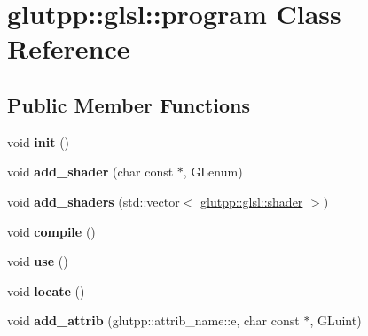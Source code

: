 \hypertarget{classglutpp_1_1glsl_1_1program}{\section{glutpp\-:\-:glsl\-:\-:program \-Class \-Reference}
\label{classglutpp_1_1glsl_1_1program}
}
\subsection*{\-Public \-Member \-Functions}
\begin{DoxyCompactItemize}
\item 
\hypertarget{classglutpp_1_1glsl_1_1program_a99ca8f6dd61152904e42afb7d1b459a3}{void {\bfseries init} ()}\label{classglutpp_1_1glsl_1_1program_a99ca8f6dd61152904e42afb7d1b459a3}

\item 
\hypertarget{classglutpp_1_1glsl_1_1program_a6cde9b2647b830ed62bb4bd34837d9fd}{void {\bfseries add\-\_\-shader} (char const $\ast$, \-G\-Lenum)}\label{classglutpp_1_1glsl_1_1program_a6cde9b2647b830ed62bb4bd34837d9fd}

\item 
\hypertarget{classglutpp_1_1glsl_1_1program_a222ee5c2b9f2f6896b6f7fe16b2864b0}{void {\bfseries add\-\_\-shaders} (std\-::vector$<$ \hyperlink{classglutpp_1_1glsl_1_1shader}{glutpp\-::glsl\-::shader} $>$)}\label{classglutpp_1_1glsl_1_1program_a222ee5c2b9f2f6896b6f7fe16b2864b0}

\item 
\hypertarget{classglutpp_1_1glsl_1_1program_aee7d2cd7b292e8dcbd7ebcdc704bfe63}{void {\bfseries compile} ()}\label{classglutpp_1_1glsl_1_1program_aee7d2cd7b292e8dcbd7ebcdc704bfe63}

\item 
\hypertarget{classglutpp_1_1glsl_1_1program_af94447e84217b4d222c9bc0104ae3ec8}{void {\bfseries use} ()}\label{classglutpp_1_1glsl_1_1program_af94447e84217b4d222c9bc0104ae3ec8}

\item 
\hypertarget{classglutpp_1_1glsl_1_1program_a0b7490fa9a0396a052d7d37140a551ab}{void {\bfseries locate} ()}\label{classglutpp_1_1glsl_1_1program_a0b7490fa9a0396a052d7d37140a551ab}

\item 
\hypertarget{classglutpp_1_1glsl_1_1program_af2403d0061bcb6e7eff6fd0e27ef57cf}{void {\bfseries add\-\_\-attrib} (glutpp\-::attrib\-\_\-name\-::e, char const $\ast$, \-G\-Luint)}\label{classglutpp_1_1glsl_1_1program_af2403d0061bcb6e7eff6fd0e27ef57cf}


\end{DoxyCompactItemize}
